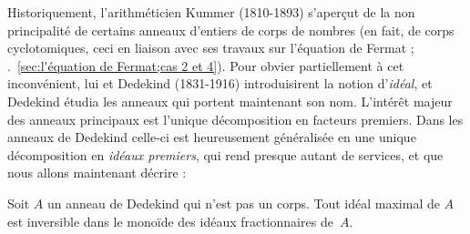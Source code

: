 \documentclass[11pt, %
  title in boldface,
  theorem in new line,
  theorem numbering = section,
  number theorems separately,
  simple name,
]{beaulivre}
\begin{document}
    Historiquement, l'arithméticien Kummer (1810-1893) s'aperçut de la non principalité de certains anneaux d'entiers de corps de nombres (en fait, de corps cyclotomiques, ceci en liaison avec ses travaux sur l'équation de Fermat ; \cf.~\cref{sec:l'équation de Fermat;cas 2 et 4}). Pour obvier partiellement à cet inconvénient, lui et Dedekind (1831-1916) introduisirent la notion d'\emph{idéal}, et Dedekind étudia les anneaux qui portent maintenant son nom. L'intérêt majeur des anneaux principaux est l'unique décomposition en facteurs premiers. Dans les anneaux de Dedekind celle-ci est heureusement généralisée en une unique décomposition en \emph{idéaux premiers}, qui rend presque autant de services, et que nous allons maintenant décrire :
    \begin{theorem}\label{thm:anneau de Dedekind;idéal maximal est inversible}
        Soit \( A \) un anneau de Dedekind qui n'est pas un corps. Tout idéal maximal de \( A \) est inversible dans le monoïde des idéaux fractionnaires de~\( A \).
    \end{theorem}
\end{document}
